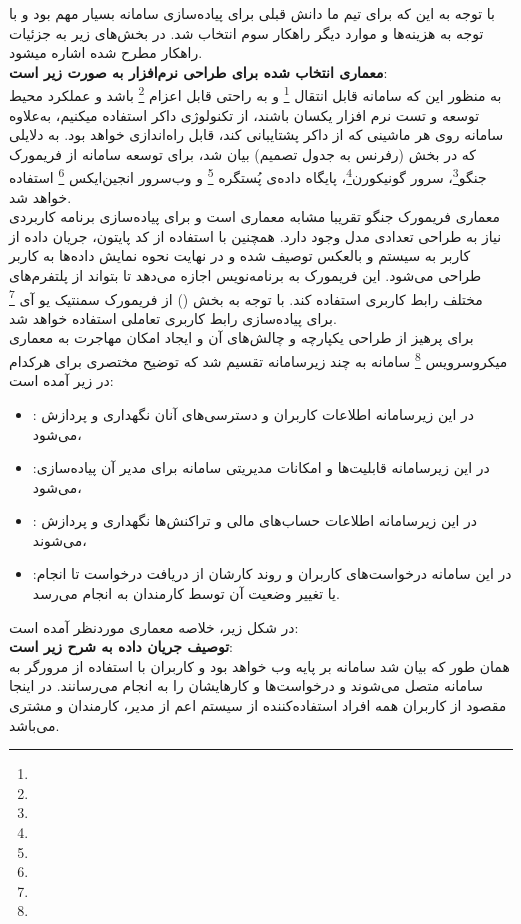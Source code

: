 \documentclass{article}
\begin{document}
با توجه به این که برای تیم ما دانش قبلی برای پیاده‌سازی سامانه بسیار مهم بود و با توجه به هزینه‌ها و موارد دیگر راهکار سوم انتخاب شد. در بخش‌های زیر به جزئیات راهکار مطرح شده اشاره میشود.\\
\textbf{معماری انتخاب شده برای طراحی نرم‌افزار به صورت زیر است}:\\
به منظور این که سامانه قابل انتقال \footnote{} و به راحتی قابل اعزام \footnote{} باشد و عملکرد محیط توسعه و تست نرم افزار یکسان باشند، از تکنولوژی داکر استفاده میکنیم، به‌علاوه سامانه روی هر ماشینی که از داکر پشتایبانی کند، قابل راه‌اندازی خواهد بود.
به دلایلی که در بخش (رفرنس به جدول تصمیم)‌ بیان شد، برای توسعه سامانه از فریمورک جنگو\footnote{}، سرور گونیکورن\footnote{}، پایگاه داده‌ی پُستگره \footnote{} و وب‌سرور انجین‌ایکس \footnote{} استفاده خواهد شد.\\
معماری فریمورک جنگو تقریبا مشابه معماری  است و برای پیاده‌سازی برنامه کاربردی نیاز به طراحی تعدادی مدل وجود دارد. همچنین با استفاده از کد پایتون، جریان داده از کاربر به سیستم و بالعکس توصیف شده و در نهایت نحوه نمایش داده‌ها به کاربر طراحی می‌شود. این فریمورک به برنامه‌نویس اجازه می‌دهد تا بتواند از پلتفرم‌های مختلف رابط کاربری استفاده کند. با توجه به بخش () از فریمورک سمنتیک یو آی \footnote{} برای پیاده‌سازی رابط کاربری تعاملی استفاده‌ خواهد شد.\\
برای پرهیز از طراحی یکپارچه و چالش‌های آن و ایجاد امکان مهاجرت به معماری میکروسرویس \footnote{} سامانه به چند زیرسامانه تقسیم شد که توضیح مختصری برای هرکدام در زیر آمده است:
\begin{itemize}
\item
{}: در این زیرسامانه اطلاعات کاربران و دسترسی‌های آنان نگهداری و پردازش می‌شود،
\item
{}:‌در این زیرسامانه قابلیت‌ها و امکانات مدیریتی سامانه برای مدیر آن پیاده‌سازی‌ می‌شود،
\item
{}: در این زیرسامانه اطلاعات حساب‌های مالی و تراکنش‌ها نگهداری و پردازش می‌شوند،
\item
{}:‌در این سامانه درخواست‌های کاربران و روند کارشان از دریافت درخواست تا انجام یا تغییر وضعیت آن توسط کارمندان به انجام می‌رسد. 
\end{itemize}
در شکل زیر، خلاصه معماری موردنظر آمده است:\\
\textbf{توصیف جریان داده به شرح زیر است}:\\
همان‌ طور که بیان شد سامانه بر پایه وب خواهد بود و کاربران با استفاده از مرورگر به سامانه متصل می‌شوند و درخواست‌‌ها و کارهایشان را به انجام می‌رسانند. در اینجا مقصود از کاربران همه افراد استفاده‌کننده از سیستم اعم از مدیر، کارمندان و مشتری می‌باشد.\\
\end{document}
